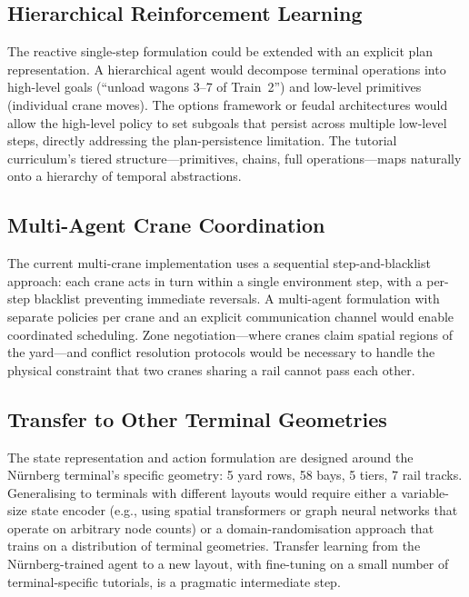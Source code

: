 \subsection{Hierarchical Reinforcement Learning}
\label{sec:concl:future:hierarchical}

The reactive single-step formulation could be extended with an explicit plan representation. A hierarchical agent would decompose terminal operations into high-level goals (``unload wagons 3--7 of Train~2'') and low-level primitives (individual crane moves). The options framework \cite{sutton1999options} or feudal architectures \cite{vezhnevets2017feudal} would allow the high-level policy to set subgoals that persist across multiple low-level steps, directly addressing the plan-persistence limitation. The tutorial curriculum's tiered structure---primitives, chains, full operations---maps naturally onto a hierarchy of temporal abstractions.

\subsection{Multi-Agent Crane Coordination}
\label{sec:concl:future:marl}

The current multi-crane implementation uses a sequential step-and-blacklist approach: each crane acts in turn within a single environment step, with a per-step blacklist preventing immediate reversals. A multi-agent formulation with separate policies per crane and an explicit communication channel would enable coordinated scheduling. Zone negotiation---where cranes claim spatial regions of the yard---and conflict resolution protocols would be necessary to handle the physical constraint that two cranes sharing a rail cannot pass each other.

\subsection{Transfer to Other Terminal Geometries}
\label{sec:concl:future:transfer}

The state representation and action formulation are designed around the N\"urnberg terminal's specific geometry: 5 yard rows, 58 bays, 5 tiers, 7 rail tracks. Generalising to terminals with different layouts would require either a variable-size state encoder (e.g., using spatial transformers or graph neural networks that operate on arbitrary node counts) or a domain-randomisation approach that trains on a distribution of terminal geometries. Transfer learning from the N\"urnberg-trained agent to a new layout, with fine-tuning on a small number of terminal-specific tutorials, is a pragmatic intermediate step.

